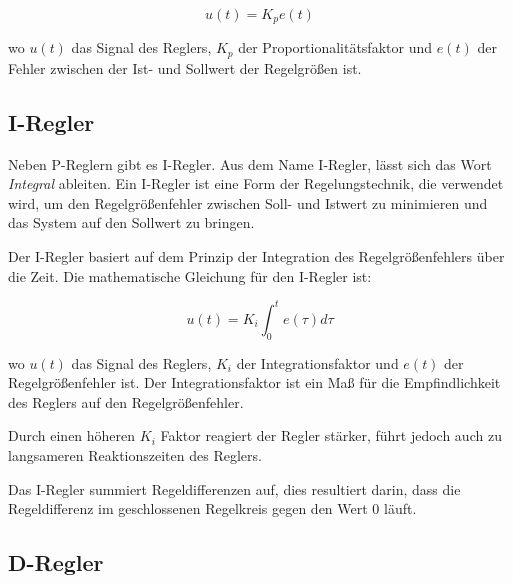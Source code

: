     \begin{figure}[H]
    \begin{equation*}
        u(t) = K_p e(t)
    \end{equation*}

\end{figure}

    wo $u(t)$ das Signal des Reglers, $K_p$ der Proportionalitätsfaktor und $e(t)$ der Fehler zwischen der Ist- und Sollwert der Regelgrößen ist.

    \subsection{I-Regler}
\label{chp:i-regler}

    Neben \ac{P-Regler}n gibt es \ac{I-Regler}.
    Aus dem Name \ac{I-Regler}, lässt sich das Wort \textit{Integral} ableiten. Ein \ac{I-Regler} ist eine Form der Regelungstechnik, die verwendet wird, um den Regelgrößenfehler zwischen Soll- und Istwert zu minimieren und das System auf den Sollwert zu bringen. 

    Der I-Regler basiert auf dem Prinzip der Integration des Regelgrößenfehlers über die Zeit. Die mathematische Gleichung für den I-Regler ist:

    \begin{figure}[H]
        \begin{equation*}
            u(t) = K_i \int_{0}^{t} e(\tau) d\tau
        \end{equation*}
    \end{figure}

    wo $u(t)$ das Signal des Reglers, $K_i$ der Integrationsfaktor und $e(t)$ der Regelgrößenfehler ist. Der Integrationsfaktor ist ein Maß für die Empfindlichkeit des Reglers auf den Regelgrößenfehler.

Durch einen höheren $K_i$ Faktor reagiert der Regler stärker, führt jedoch auch zu langsameren Reaktionszeiten des Reglers.

    Das \ac{I-Regler} summiert Regeldifferenzen auf, dies resultiert darin, dass die Regeldifferenz im geschlossenen Regelkreis gegen den Wert 0 läuft.



    \subsection{D-Regler}
    \label{chp:d-regler}
    
